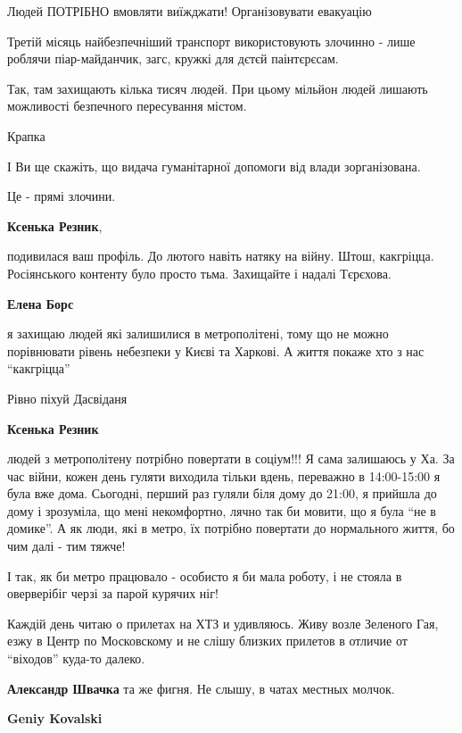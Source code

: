 \begin{itemize}
\begin{itemize}
Людей ПОТРІБНО вмовляти виїжджати! Організовувати евакуацію

Третій місяць найбезпечніший транспорт використовують злочинно - лише роблячи
піар-майданчик, загс, кружкі для дєтєй паінтєрєсам.

Так, там захищають кілька тисяч людей. При цьому мільйон людей лишають
можливості безпечного пересування містом.

Крапка

І Ви ще скажіть, що видача гуманітарної допомоги від влади зорганізована.

Це - прямі злочини.

\textbf{Ксенька Резник}, 

подивилася ваш профіль. До лютого навіть натяку на війну. Штош, какгріцца.
Росіянського контенту було просто тьма. Захищайте і надалі Тєрєхова.

\textbf{Елена Борс} 

я захищаю людей які залишилися в метрополітені, тому що не можно порівнювати
рівень небезпеки у Києві та Харкові. А життя покаже хто з нас \enquote{какгріцца}

Рівно піхуй
Дасвіданя

\textbf{Ксенька Резник} 

людей з метрополітену потрібно повертати в соціум!!! Я сама залишаюсь у Ха. За
час війни, кожен день гуляти виходила тільки вдень, переважно в 14:00-15:00 я
була вже дома. Сьогодні, перший раз гуляли біля дому до 21:00, я прийшла до
дому і зрозуміла, що мені некомфортно, лячно так би мовити, що я була \enquote{не в
домике}. А як люди, які в метро, їх потрібно повертати до нормального життя, бо
чим далі - тим тяжче!

І так, як би метро працювало - особисто я би мала роботу, і не стояла в
оверверібіг черзі за парой курячих ніг!

\end{itemize} %


Каждій день читаю о прилетах на ХТЗ и удивляюсь. Живу возле Зеленого Гая, езжу
в Центр по Московскому и не слішу близких прилетов в отличие от \enquote{віходов}
куда-то далеко.

\begin{itemize} %
\textbf{Александр Швачка} та же фигня. Не слышу, в чатах местных молчок.

\textbf{Geniy Kovalski} 


\end{itemize}
\end{itemize}
